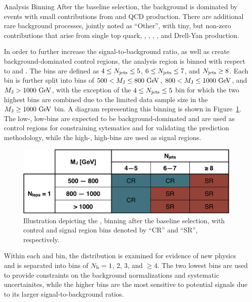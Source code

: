 \begin{section}{Analysis Binning}
After the baseline selection, the background is dominated by \ttbar events with small contributions from \Wjets and QCD production.
There are additional rare background processes, jointly noted as ``Other'', with tiny, but non-zero contributions that arise from single top quark, \ttW, \ttZ, \ttH, \tttt, and Drell-Yan production.

In order to further increase the signal-to-background ratio, as well as create background-dominated control regions, the analysis region is binned with respect to \Njets and \MJ. 
The \Njets bins are defined as $4 \leq N_{\mathrm{jets}} \leq 5$, $6 \leq N_{\mathrm{jets}} \leq 7$, and $N_{\mathrm{jets}} \geq 8$.
Each \Njets bin is further split into bins of $500 < M_{\mathrm{J}} \leq 800~\mathrm{Ge\kern -0.1em V}$, $800 < M_{\mathrm{J}} \leq 1000~\mathrm{Ge\kern -0.1em V}$, and $M_{\mathrm{J}} > 1000~\mathrm{Ge\kern -0.1em V}$, with the exception of the $4 \leq N_{\mathrm{jets}} \leq 5$ bin for which the two highest \MJ bins are combined due to the limited data sample size in the $M_{\mathrm{J}} \geq 1000~\mathrm{Ge\kern -0.1em V}$ bin.
A diagram representing this binning is shown in Figure~\ref{fig:analysis_regions}.
The low-\Njets, low-\MJ bins are expected to be background-dominated and are used as control regions for constraining sytematics and for validating the prediction methodology, while the high-\Njets, high-\MJ bins are used as signal regions.

\begin{figure}[tbp!]
\centering
\includegraphics[angle=0,width=0.80\columnwidth]{fig/binning_nlep1.pdf}
\caption{Illustration depicting the \Njets, \MJ binning after the baseline selection, with control and signal region bins denoted by ``CR'' and ``SR'', respectively.}
\label{fig:analysis_regions} 
\end{figure}

Within each \Njets and \MJ bin, the \Nb distribution is examined for evidence of new physics and is separated into bins of $N_{\mathrm{b}} = 1$, 2, 3, and $\geq 4$.
The two lowest \Nb bins are used to provide constraints on the background normalizations and systematic uncertainites, while the higher \Nb bins are the most sensitive to potential signals due to its larger signal-to-background ratios.


\end{section}
